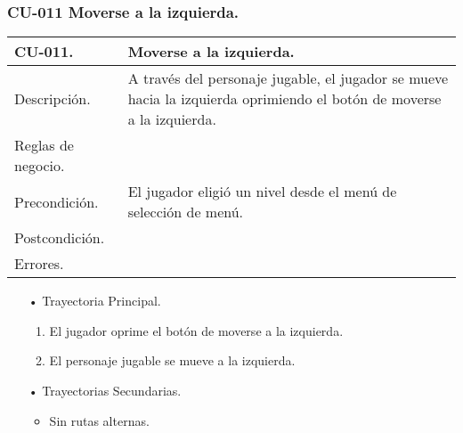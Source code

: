 \subsubsection{CU-011 Moverse a la izquierda.} \label{CU:11}
\begin{longtable}[c]{ | m{5cm} | m{10cm}|} 
		\hline
		\rowcolor{cyan}CU-011. & Moverse a la izquierda.\\ 
		\hline
		Descripción. & A través del personaje jugable, el jugador se mueve hacia la izquierda oprimiendo el botón de moverse a la izquierda. \\ 
		\hline
		Reglas de negocio. &\\ 
		\hline
		Precondición. & El jugador eligió un nivel desde el menú de selección de menú.\\
		\hline
		Postcondición. & \\
		\hline
		Errores. & \\
		\hline
\end{longtable}

\begin{itemize}
	\item[•] Trayectoria Principal.
		\begin{enumerate}
			\item El jugador oprime el botón de moverse a la izquierda.
			\item El personaje jugable se mueve a la izquierda.

		\end{enumerate}
	\item[•] Trayectorias Secundarias.
		\begin{itemize}
			\item Sin rutas alternas.
		\end{itemize}
\end{itemize}